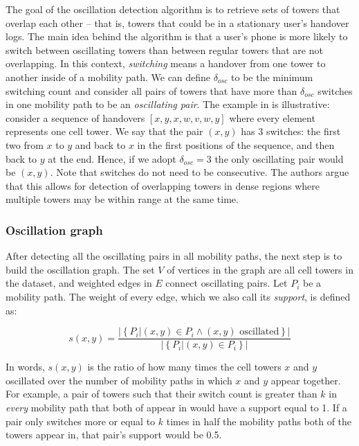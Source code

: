 \documentclass[letterpaper, 12pt, conference]{ieeeconf}
\begin{document}
The goal of the oscillation detection algorithm is to retrieve sets of towers 
that overlap each other -- that is, towers that could be in a stationary 
user's handover logs. The main idea behind the algorithm is that a user's 
phone is more likely to switch between oscillating towers than between 
regular towers that are not overlapping. In this context, \textit{switching} 
means a handover from one tower to another inside of a mobility path. We can 
define $\delta_{osc}$ to be the minimum switching count and consider all 
pairs of towers that have more than $\delta_{osc}$ switches in one mobility 
path to be an \textit{oscillating pair}. The example in \cite{mobilityprofiler}
is illustrative: consider a sequence of handovers $\left[x, y, x, w, v, w, y
\right]$ where every element represents one cell tower. We say that the pair $
(x, y)$ has 3 switches: the first two from $x$ to $y$ and back to $x$ in the 
first positions of the sequence, and then back to $y$ at the end. Hence, if 
we adopt $\delta_{osc}=3$ the only oscillating pair would be $(x, y)$. Note 
that switches do not need to be consecutive. The authors argue that this 
allows for detection of overlapping towers in dense regions where multiple 
towers may be within range at the same time.

\subsubsection{Oscillation graph}

After detecting all the oscillating pairs in all mobility paths, the next 
step is to build the oscillation graph. The set $V$ of vertices in the graph 
are all cell towers in the dataset, and weighted edges in $E$ connect 
oscillating pairs. Let $P_i$ be a mobility path. The weight of every edge, 
which we also call its \textit{support}, is defined as:

\begin{equation*}
s(x,y) = \frac{|\left\{P_i| (x, y) \in P_i \wedge (x, y) \text{ oscillated}
\right\}|}{|\left\{P_i| (x, y) \in P_i\right\}|}
\end{equation*}

In words, $s(x,y)$ is the ratio of how many times the cell towers $x$ and $y$ 
oscillated over the number of mobility paths in which $x$ and $y$ appear together. For 
example, a pair of towers such that their switch count is greater than $k$ in \textit{every} mobility path that both of appear in would have a support 
equal to 1. If a pair only switches more or equal to $k$ times in half the 
mobility paths both of the towers appear in, that pair's support would be 0.5.
\end{document}
